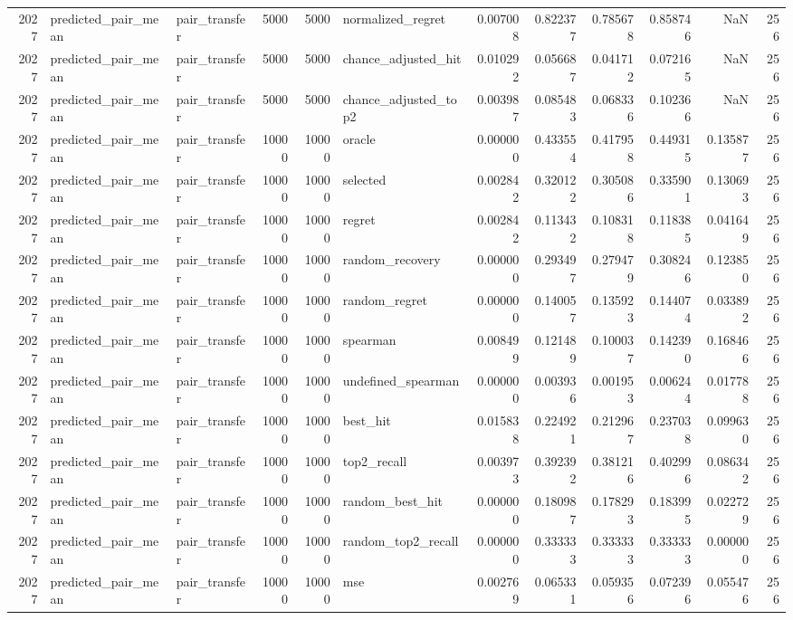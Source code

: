 \begin{tabular}{rllrrlrrrrrr}
2027 & predicted_pair_mean & pair_transfer & 5000 & 5000 & normalized_regret & 0.007008 & 0.822377 & 0.785678 & 0.858746 & NaN & 256 \\
2027 & predicted_pair_mean & pair_transfer & 5000 & 5000 & chance_adjusted_hit & 0.010292 & 0.056687 & 0.041712 & 0.072165 & NaN & 256 \\
2027 & predicted_pair_mean & pair_transfer & 5000 & 5000 & chance_adjusted_top2 & 0.003987 & 0.085483 & 0.068336 & 0.102366 & NaN & 256 \\
2027 & predicted_pair_mean & pair_transfer & 10000 & 10000 & oracle & 0.000000 & 0.433554 & 0.417958 & 0.449315 & 0.135877 & 256 \\
2027 & predicted_pair_mean & pair_transfer & 10000 & 10000 & selected & 0.002842 & 0.320122 & 0.305086 & 0.335901 & 0.130693 & 256 \\
2027 & predicted_pair_mean & pair_transfer & 10000 & 10000 & regret & 0.002842 & 0.113432 & 0.108318 & 0.118385 & 0.041649 & 256 \\
2027 & predicted_pair_mean & pair_transfer & 10000 & 10000 & random_recovery & 0.000000 & 0.293497 & 0.279479 & 0.308246 & 0.123850 & 256 \\
2027 & predicted_pair_mean & pair_transfer & 10000 & 10000 & random_regret & 0.000000 & 0.140057 & 0.135923 & 0.144074 & 0.033892 & 256 \\
2027 & predicted_pair_mean & pair_transfer & 10000 & 10000 & spearman & 0.008499 & 0.121489 & 0.100037 & 0.142390 & 0.168466 & 256 \\
2027 & predicted_pair_mean & pair_transfer & 10000 & 10000 & undefined_spearman & 0.000000 & 0.003936 & 0.001953 & 0.006244 & 0.017788 & 256 \\
2027 & predicted_pair_mean & pair_transfer & 10000 & 10000 & best_hit & 0.015838 & 0.224921 & 0.212967 & 0.237038 & 0.099630 & 256 \\
2027 & predicted_pair_mean & pair_transfer & 10000 & 10000 & top2_recall & 0.003973 & 0.392392 & 0.381216 & 0.402996 & 0.086342 & 256 \\
2027 & predicted_pair_mean & pair_transfer & 10000 & 10000 & random_best_hit & 0.000000 & 0.180987 & 0.178293 & 0.183995 & 0.022729 & 256 \\
2027 & predicted_pair_mean & pair_transfer & 10000 & 10000 & random_top2_recall & 0.000000 & 0.333333 & 0.333333 & 0.333333 & 0.000000 & 256 \\
2027 & predicted_pair_mean & pair_transfer & 10000 & 10000 & mse & 0.002769 & 0.065331 & 0.059356 & 0.072396 & 0.055476 & 256 \\

\end{tabular}

